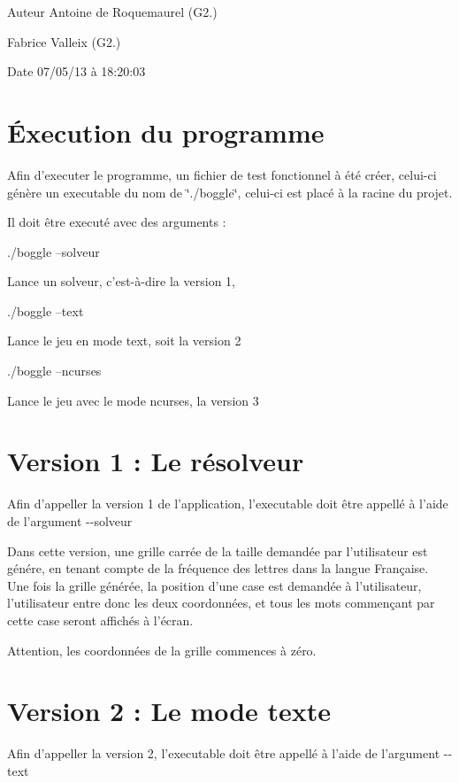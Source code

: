 \begin{DoxyAuthor}{Auteur}
Antoine de Roquemaurel (G2.) 

Fabrice Valleix (G2.) 
\end{DoxyAuthor}
\begin{DoxyDate}{Date}
07/05/13 à 18\-:20\-:03
\end{DoxyDate}
\hypertarget{index_execution}{}\section{Éxecution du programme}\label{index_execution}
Afin d'executer le programme, un fichier de test fonctionnel à été créer, celui-\/ci génère un executable du nom de \char`\"{}./boggle\char`\"{}, celui-\/ci est placé à la racine du projet.

Il doit être executé avec des arguments \-: \begin{DoxyItemize}
\item 
\begin{DoxyCode}
./boggle --solveur 
\end{DoxyCode}
 Lance un solveur, c'est-\/à-\/dire la version 1, \item 
\begin{DoxyCode}
./boggle --text 
\end{DoxyCode}
 Lance le jeu en mode text, soit la version 2 \item 
\begin{DoxyCode}
./boggle --ncurses 
\end{DoxyCode}
 Lance le jeu avec le mode ncurses, la version 3\end{DoxyItemize}
\hypertarget{index_version1}{}\section{Version 1 \-: Le résolveur}\label{index_version1}
Afin d'appeller la version 1 de l'application, l'executable doit être appellé à l'aide de l'argument -\/-\/solveur

Dans cette version, une grille carrée de la taille demandée par l'utilisateur est génére, en tenant compte de la fréquence des lettres dans la langue Française. Une fois la grille générée, la position d'une case est demandée à l'utilisateur, l'utilisateur entre donc les deux coordonnées, et tous les mots commençant par cette case seront affichés à l'écran.

Attention, les coordonnées de la grille commences à zéro.\hypertarget{index_version2}{}\section{Version 2 \-: Le mode texte}\label{index_version2}
Afin d'appeller la version 2, l'executable doit être appellé à l'aide de l'argument -\/-\/text

